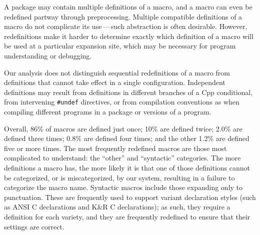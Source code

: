 \documentclass[10pt]{article}
\newcommand{\captionsmall}[1]{\caption[]{\small #1}}
\begin{document}
A package may contain multiple definitions of a macro, and a macro can even
be redefined partway through preprocessing.  Multiple compatible
definitions of a macro do not complicate its use\,---\,such abstraction is
often desirable.  However, redefinitions make it harder to determine
exactly which definition of a macro will be used at a particular expansion
site, which may be necessary for program understanding or debugging.

Our analysis does not distinguish sequential redefinitions of a macro from
definitions that cannot take effect in a single configuration.
Independent definitions may result from definitions in different branches
of a Cpp conditional, from intervening {\tt \#undef} directives, or from
compilation conventions as when compiling different programs in a package
or versions of a program.



Overall, 86\% of macros are defined just once; 10\% are defined twice;
2.0\% are defined three times; 0.8\% are defined four times; and the other
1.2\% are defined five or more times.
The most frequently redefined macros are those most complicated to
understand: the ``other'' and ``syntactic'' categories.  The more
definitions a macro has, the more likely it is that one of those
definitions cannot be categorized, or is miscategorized, by our system,
resulting in a failure to categorize the macro name.  Syntactic macros
include those expanding only to punctuation.  These are frequently used to
support variant declaration styles (such as ANSI C declarations and K\&R C
declarations); as such, they require a definition for each variety, and
they are frequently redefined to ensure that their
settings are correct.
\end{document}
